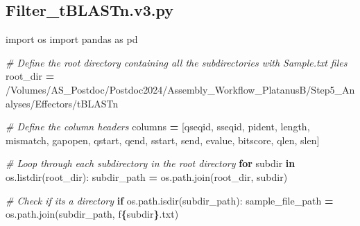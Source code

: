 \documentclass[
]{book}
\newenvironment{Shaded}{\begin{snugshade}}{\end{snugshade}}
\newcommand{\CommentTok}[1]{\textcolor[rgb]{0.56,0.35,0.01}{\textit{#1}}}
\newcommand{\ControlFlowTok}[1]{\textcolor[rgb]{0.13,0.29,0.53}{\textbf{#1}}}
\newcommand{\ImportTok}[1]{#1}
\newcommand{\KeywordTok}[1]{\textcolor[rgb]{0.13,0.29,0.53}{\textbf{#1}}}
\newcommand{\NormalTok}[1]{#1}
\newcommand{\OperatorTok}[1]{\textcolor[rgb]{0.81,0.36,0.00}{\textbf{#1}}}
\newcommand{\SpecialCharTok}[1]{\textcolor[rgb]{0.81,0.36,0.00}{\textbf{#1}}}
\newcommand{\SpecialStringTok}[1]{\textcolor[rgb]{0.31,0.60,0.02}{#1}}
\newcommand{\StringTok}[1]{\textcolor[rgb]{0.31,0.60,0.02}{#1}}
\begin{document}
\subsection{Filter\_tBLASTn.v3.py}\label{filtertblastn3-script}

\begin{Shaded}
\begin{Highlighting}[]
\ImportTok{import}\NormalTok{ os}
\ImportTok{import}\NormalTok{ pandas }\ImportTok{as}\NormalTok{ pd}

\CommentTok{\# Define the root directory containing all the subdirectories with Sample.txt files}
\NormalTok{root\_dir }\OperatorTok{=} \StringTok{\textquotesingle{}/Volumes/AS\_Postdoc/Postdoc2024/Assembly\_Workflow\_PlatanusB/Step5\_Analyses/Effectors/tBLASTn\textquotesingle{}}

\CommentTok{\# Define the column headers}
\NormalTok{columns }\OperatorTok{=}\NormalTok{ [}\StringTok{\textquotesingle{}qseqid\textquotesingle{}}\NormalTok{, }\StringTok{\textquotesingle{}sseqid\textquotesingle{}}\NormalTok{, }\StringTok{\textquotesingle{}pident\textquotesingle{}}\NormalTok{, }\StringTok{\textquotesingle{}length\textquotesingle{}}\NormalTok{, }\StringTok{\textquotesingle{}mismatch\textquotesingle{}}\NormalTok{, }\StringTok{\textquotesingle{}gapopen\textquotesingle{}}\NormalTok{, }
           \StringTok{\textquotesingle{}qstart\textquotesingle{}}\NormalTok{, }\StringTok{\textquotesingle{}qend\textquotesingle{}}\NormalTok{, }\StringTok{\textquotesingle{}sstart\textquotesingle{}}\NormalTok{, }\StringTok{\textquotesingle{}send\textquotesingle{}}\NormalTok{, }\StringTok{\textquotesingle{}evalue\textquotesingle{}}\NormalTok{, }\StringTok{\textquotesingle{}bitscore\textquotesingle{}}\NormalTok{, }\StringTok{\textquotesingle{}qlen\textquotesingle{}}\NormalTok{, }\StringTok{\textquotesingle{}slen\textquotesingle{}}\NormalTok{]}

\CommentTok{\# Loop through each subdirectory in the root directory}
\ControlFlowTok{for}\NormalTok{ subdir }\KeywordTok{in}\NormalTok{ os.listdir(root\_dir):}
\NormalTok{    subdir\_path }\OperatorTok{=}\NormalTok{ os.path.join(root\_dir, subdir)}
    
    \CommentTok{\# Check if it\textquotesingle{}s a directory}
    \ControlFlowTok{if}\NormalTok{ os.path.isdir(subdir\_path):}
\NormalTok{        sample\_file\_path }\OperatorTok{=}\NormalTok{ os.path.join(subdir\_path, }\SpecialStringTok{f\textquotesingle{}}\SpecialCharTok{\{}\NormalTok{subdir}\SpecialCharTok{\}}\SpecialStringTok{.txt\textquotesingle{}}\NormalTok{)}
        

\end{Highlighting}
\end{Shaded}
\end{document}
